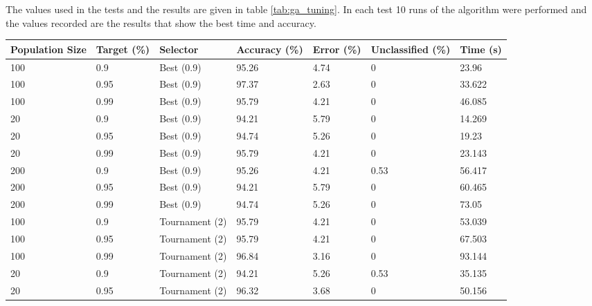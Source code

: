 \documentclass[a4paper]{article}
\begin{document}
The values used in the tests and the results are given in table
\ref{tab:ga_tuning}. In each test 10 runs of the algorithm were performed and
the values recorded are the results that show the best time and accuracy.

\begin{table}[h!]
  \centering
  \begin{tabular}{@{}lllllll@{}}
    \toprule
    Population Size & Target (\%) & Selector       & Accuracy (\%) & Error (\%) & Unclassified (\%) & Time (s) \\
    \midrule
    100             & 0.9         & Best (0.9)     & 95.26         & 4.74       & 0                 & 23.96    \\
    100             & 0.95        & Best (0.9)     & 97.37         & 2.63       & 0                 & 33.622   \\
    100             & 0.99        & Best (0.9)     & 95.79         & 4.21       & 0                 & 46.085   \\
    20              & 0.9         & Best (0.9)     & 94.21         & 5.79       & 0                 & 14.269   \\
    20              & 0.95        & Best (0.9)     & 94.74         & 5.26       & 0                 & 19.23    \\
    20              & 0.99        & Best (0.9)     & 95.79         & 4.21       & 0                 & 23.143   \\
    200             & 0.9         & Best (0.9)     & 95.26         & 4.21       & 0.53              & 56.417   \\
    200             & 0.95        & Best (0.9)     & 94.21         & 5.79       & 0                 & 60.465   \\
    200             & 0.99        & Best (0.9)     & 94.74         & 5.26       & 0                 & 73.05    \\
    100             & 0.9         & Tournament (2) & 95.79         & 4.21       & 0                 & 53.039   \\
    100             & 0.95        & Tournament (2) & 95.79         & 4.21       & 0                 & 67.503   \\
    100             & 0.99        & Tournament (2) & 96.84         & 3.16       & 0                 & 93.144   \\
    20              & 0.9         & Tournament (2) & 94.21         & 5.26       & 0.53              & 35.135   \\
    20              & 0.95        & Tournament (2) & 96.32         & 3.68       & 0                 & 50.156   \\

\end{tabular}
\end{table}
\end{document}
